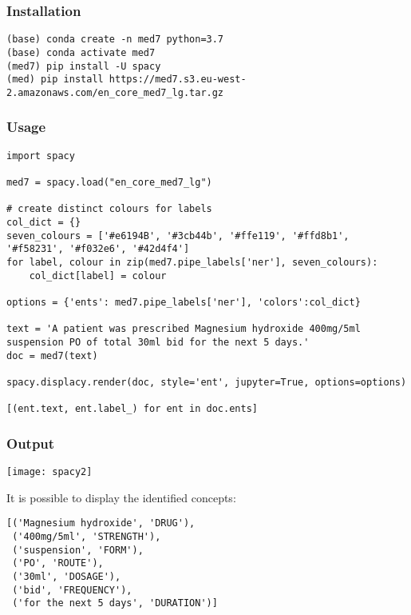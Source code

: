 \begin{frame}[fragile]\frametitle{Installation}


\begin{lstlisting}
(base) conda create -n med7 python=3.7
(base) conda activate med7
(med7) pip install -U spacy
(med) pip install https://med7.s3.eu-west-2.amazonaws.com/en_core_med7_lg.tar.gz

\end{lstlisting}


\end{frame}

\begin{frame}[fragile]\frametitle{Usage}


\begin{lstlisting}
import spacy

med7 = spacy.load("en_core_med7_lg")

# create distinct colours for labels
col_dict = {}
seven_colours = ['#e6194B', '#3cb44b', '#ffe119', '#ffd8b1', '#f58231', '#f032e6', '#42d4f4']
for label, colour in zip(med7.pipe_labels['ner'], seven_colours):
    col_dict[label] = colour

options = {'ents': med7.pipe_labels['ner'], 'colors':col_dict}

text = 'A patient was prescribed Magnesium hydroxide 400mg/5ml suspension PO of total 30ml bid for the next 5 days.'
doc = med7(text)

spacy.displacy.render(doc, style='ent', jupyter=True, options=options)

[(ent.text, ent.label_) for ent in doc.ents]
\end{lstlisting}


\end{frame}

\begin{frame}[fragile]\frametitle{Output}

\begin{center}
\texttt{[image: spacy2]}
\end{center}

It is possible to display the identified concepts:

\begin{lstlisting}
[('Magnesium hydroxide', 'DRUG'),
 ('400mg/5ml', 'STRENGTH'),
 ('suspension', 'FORM'),
 ('PO', 'ROUTE'),
 ('30ml', 'DOSAGE'),
 ('bid', 'FREQUENCY'),
 ('for the next 5 days', 'DURATION')]
\end{lstlisting}

\end{frame}